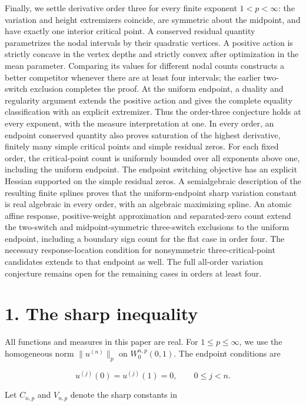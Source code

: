 \documentclass[11pt]{article}
\begin{document}
Finally, we settle derivative order three for every finite exponent
\(1<p<\infty\): the variation and height extremizers coincide, are
symmetric about the midpoint, and have exactly one interior critical
point. A conserved residual quantity parametrizes the nodal intervals by
their quadratic vertices. A positive action is strictly concave in the
vertex depths and strictly convex after optimization in the mean
parameter. Comparing its values for different nodal counts constructs a
better competitor whenever there are at least four intervals; the
earlier two-switch exclusion completes the proof. At the uniform
endpoint, a duality and regularity argument extends the positive action
and gives the complete equality classification with an explicit
extremizer. Thus the order-three conjecture holds at every exponent,
with the measure interpretation at one. In every order, an endpoint
conserved quantity also proves saturation of the highest derivative,
finitely many simple critical points and simple residual zeros. For each
fixed order, the critical-point count is uniformly bounded over all
exponents above one, including the uniform endpoint. The endpoint
switching objective has an explicit Hessian supported on the simple
residual zeros. A semialgebraic description of the resulting finite
splines proves that the uniform-endpoint sharp variation constant is
real algebraic in every order, with an algebraic maximizing spline. An
atomic affine response, positive-weight approximation and separated-zero
count extend the two-switch and midpoint-symmetric three-switch
exclusions to the uniform endpoint, including a boundary sign count for
the flat case in order four. The necessary response-location condition
for nonsymmetric three-critical-point candidates extends to that
endpoint as well. The full all-order variation conjecture remains open
for the remaining cases in orders at least four.

\section{1. The sharp inequality}\label{the-sharp-inequality}

All functions and measures in this paper are real. For
\(1\le p\le\infty\), we use the homogeneous norm \(\|u^{(n)}\|_p\) on
\(W_0^{n,p}(0,1)\). The endpoint conditions are

\[
u^{(j)}(0)=u^{(j)}(1)=0,\qquad 0\le j<n.
\tag{1}
\]

Let \(C_{n,p}\) and \(V_{n,p}\) denote the sharp constants in
\end{document}
